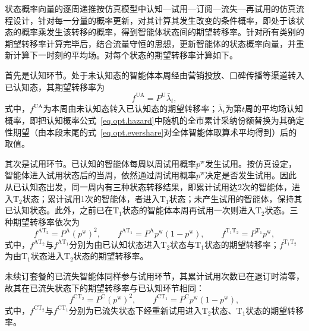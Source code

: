 状态概率向量的逐周递推按仿真模型中认知—试用—订阅—流失—再试用的仿真流程设计，针对每一分量的概率更新，对其计算其发生改变的条件概率，即处于该状态的概率乘发生该转移的概率，得到智能体状态间的期望转移率。针对所有类别的期望转移率计算完毕后，结合流量守恒的思想，更新智能体的状态概率向量，并重新计算下一时刻的平均场。对每个状态的期望转移率计算如下。

首先是认知环节。处于未认知态的智能体本周经由营销投放、口碑传播等渠道转入已认知态，其期望转移率为
\begin{equation}
f^{\mathrm{UA}} = P^{\mathrm{U}}\bar{\lambda}_{t},
\label{eq.opt.mfaware}
\end{equation}
式中，$f^{\mathrm{UA}}$为本周由未认知态转入已认知态的期望转移率；$\bar{\lambda}_{t}$为第$t$周的平均场认知概率，即把认知概率公式~\eqref{eq.opt.hazard}中随机的全市累计采纳份额替换为其确定性期望（由本段末尾的式~\eqref{eq.opt.evershare}对全体智能体取算术平均得到）后的取值。
 
其次是试用环节。已认知的智能体每周以周试用概率$p^{\mathrm{w}}$发生试用。按仿真设定，智能体进入试用状态后的当周，依然通过周试用概率$p^{\mathrm{w}}$决定是否发生试用。因此从已认知态出发，同一周内有三种状态转移结果，即累计试用达2次的智能体，进入$\mathrm{T}_{2}$状态；累计试用1次的智能体，者进入$\mathrm{T}_{1}$状态；未产生试用的智能体，保持其已认知状态。此外，之前已在$\mathrm{T}_{1}$状态的智能体本周再试用一次则进入$\mathrm{T}_{2}$状态。三种期望转移率依次为
\begin{equation}
f^{\mathrm{AT}_{2}} = P^{\mathrm{A}}\left(p^{\mathrm{w}}\right)^{2},\qquad
f^{\mathrm{AT}_{1}} = P^{\mathrm{A}}p^{\mathrm{w}}\left(1-p^{\mathrm{w}}\right),\qquad
f^{\mathrm{T}_{1}\mathrm{T}_{2}} = P^{\mathrm{T}_{1}}p^{\mathrm{w}},
\label{eq.opt.mftry}
\end{equation}
式中，$f^{\mathrm{AT}_{2}}$与$f^{\mathrm{AT}_{1}}$分别为由已认知状态进入$\mathrm{T}_{2}$状态与$\mathrm{T}_{1}$状态的期望转移率；$f^{\mathrm{T}_{1}\mathrm{T}_{2}}$为由$\mathrm{T}_{1}$状态进入$\mathrm{T}_{2}$状态的期望转移率。
 
未续订套餐的已流失智能体同样参与试用环节，其累计试用次数已在退订时清零，故其在已流失状态下的期望转移率与已认知环节相同：
\begin{equation}
f^{\mathrm{CT}_{2}} = P^{\mathrm{C}}\left(p^{\mathrm{w}}\right)^{2},\qquad
f^{\mathrm{CT}_{1}} = P^{\mathrm{C}}p^{\mathrm{w}}\left(1-p^{\mathrm{w}}\right),
\label{eq.opt.mfreentry}
\end{equation}
式中，$f^{\mathrm{CT}_{2}}$与$f^{\mathrm{CT}_{1}}$分别为已流失状态下经重新试用进入$\mathrm{T}_{2}$状态、$\mathrm{T}_{1}$状态的期望转移率。
 
